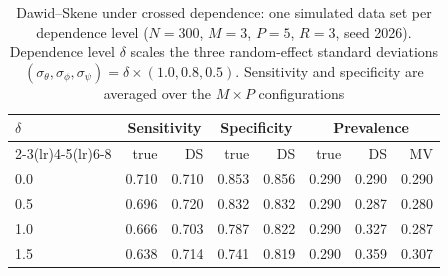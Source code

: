 \begin{table}[htbp]
\centering
\small
\caption{Dawid--Skene under crossed dependence: one simulated data set per dependence level ($N = 300$, $M = 3$, $P = 5$, $R = 3$, seed 2026). Dependence level $\delta$ scales the three random-effect standard deviations $(\sigma_\theta, \sigma_\phi, \sigma_\psi) = \delta \times (1.0, 0.8, 0.5)$. Sensitivity and specificity are averaged over the $M \times P$ configurations}\label{tab:baseline}
\begin{tabular}{lrrrrrrr}
\toprule
$\delta$ & \multicolumn{2}{c}{Sensitivity} & \multicolumn{2}{c}{Specificity} & \multicolumn{3}{c}{Prevalence} \\
\cmidrule(lr){2-3}\cmidrule(lr){4-5}\cmidrule(lr){6-8}
 & true & DS & true & DS & true & DS & MV \\
\midrule
0.0 & 0.710 & 0.710 & 0.853 & 0.856 & 0.290 & 0.290 & 0.290 \\
0.5 & 0.696 & 0.720 & 0.832 & 0.832 & 0.290 & 0.287 & 0.280 \\
1.0 & 0.666 & 0.703 & 0.787 & 0.822 & 0.290 & 0.327 & 0.287 \\
1.5 & 0.638 & 0.714 & 0.741 & 0.819 & 0.290 & 0.359 & 0.307 \\
\bottomrule
\end{tabular}
\end{table}
